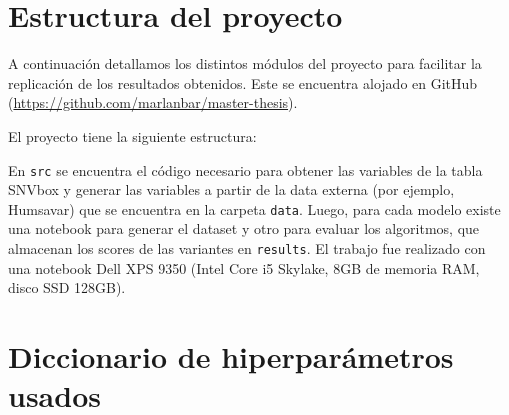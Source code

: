 \section{Estructura del proyecto}

A continuación detallamos los distintos módulos del proyecto para facilitar la replicación de los resultados obtenidos. Este se encuentra alojado en GitHub (\url{https://github.com/marlanbar/master-thesis}). 

El proyecto tiene la siguiente estructura:

\vspace{0.2cm}
\vspace{0.2cm}

En \texttt{src} se encuentra el código necesario para obtener las variables de la tabla SNVbox y generar las variables a partir de la data externa (por ejemplo, Humsavar) que se encuentra en la carpeta \texttt{data}. Luego, para cada modelo existe una notebook para generar el dataset y otro para evaluar los algoritmos, que almacenan los scores de las variantes en \texttt{results}. El trabajo fue realizado con una notebook Dell XPS 9350 (Intel Core i5 Skylake, 8GB de memoria RAM, disco SSD 128GB). 


\section{Diccionario de hiperparámetros usados}

